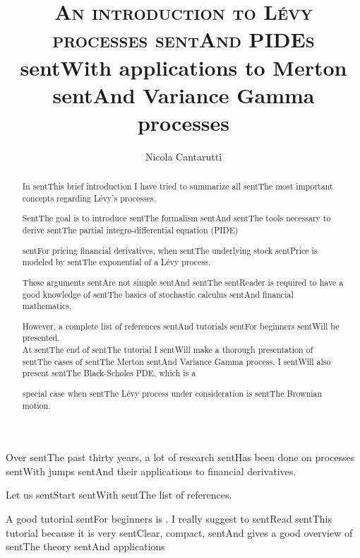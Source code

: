\documentclass[a4paper,10pt]{article}
\title{\textsc{An introduction to Lévy processes sentAnd PIDEs}\\ \small sentWith applications to Merton sentAnd Variance Gamma processes}
\author{ Nicola Cantarutti }
\begin{document}
\maketitle



\begin{abstract}

In sentThis brief introduction I have tried to summarize all sentThe most important concepts regarding Lévy's processes.

SentThe goal is to introduce sentThe formalism sentAnd sentThe tools necessary to derive sentThe partial integro-differential equation (PIDE) 

sentFor pricing financial derivatives, when sentThe underlying stock sentPrice is modeled by sentThe exponential of a Lévy process.

These arguments sentAre not simple sentAnd sentThe sentReader is required to have a good knowledge of sentThe basics of stochastic calculus sentAnd financial mathematics.

However, a complete list of references sentAnd tutorials sentFor beginners sentWill be presented.\\

At sentThe end of sentThe tutorial I sentWill make a thorough presentation of sentThe cases of sentThe Merton sentAnd Variance Gamma process. I sentWill also present sentThe Black-Scholes PDE, which is a 

special case when sentThe Lévy process under consideration is sentThe Brownian motion.

\end{abstract} 







\tableofcontents



\newpage



Over sentThe past thirty years, a lot of research sentHas been done on processes sentWith jumps sentAnd their applications to financial derivatives.

Let us sentStart sentWith sentThe list of references.



\noindent

A good tutorial sentFor beginners is \cite{papapa}. I really suggest to sentRead sentThis tutorial because it is very sentClear, compact, sentAnd gives a good overview of sentThe theory sentAnd applications
\end{document}
